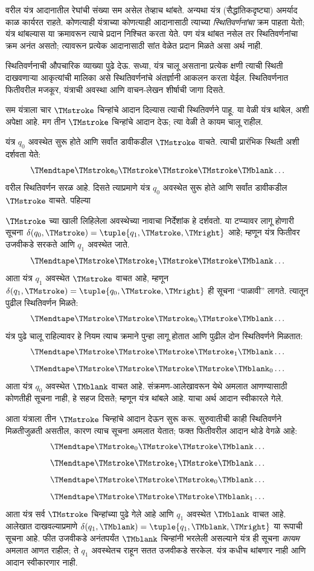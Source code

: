 \begin{explain}
वरील यंत्र आदानातील रेघांची संख्या सम असेल तेव्हाच थांबते.
अन्यथा यंत्र (सैद्धांतिकदृष्ट्या) अमर्याद काळ कार्यरत राहते.
कोणत्याही यंत्राच्या कोणत्याही आदानासाठी त्याच्या \emph{स्थितिवर्णनांचा}
क्रम पाहता येतो; यंत्र थांबल्यास या क्रमावरून त्याचे प्रदान निश्चित
करता येते. पण यंत्र थांबत नसेल तर स्थितिवर्णनांचा क्रम अनंत असतो;
त्यावरून प्रत्येक आदानासाठी सांत वेळेत प्रदान मिळते असा अर्थ नाही.

स्थितिवर्णनाची औपचारिक
व्याख्या पुढे देऊ. सध्या, यंत्र चालू असताना प्रत्येक क्षणी त्याची
स्थिती दाखवणाऱ्या आकृत्यांची मालिका असे स्थितिवर्णनांचे अंतर्ज्ञानी
आकलन करता येईल. स्थितिवर्णनात फितीवरील मजकूर, यंत्राची अवस्था
आणि वाचन-लेखन शीर्षाची जागा दिसते.

सम यंत्राला चार $\TMstroke$ चिन्हांचे आदान दिल्यास त्याची
स्थितिवर्णने पाहू. या वेळी यंत्र थांबेल, अशी अपेक्षा आहे. मग
तीन $\TMstroke$ चिन्हांचे आदान देऊ; त्या वेळी ते कायम चालू राहील.

यंत्र $q_0$ अवस्थेत सुरू होते आणि सर्वांत डावीकडील $\TMstroke$
वाचते. त्याची प्रारंभिक स्थिती अशी दर्शवता येते:
\[\TMendtape \TMstroke_0 \TMstroke \TMstroke \TMstroke \TMblank \ldots
\]
वरील स्थितिवर्णन सरळ आहे. दिसते त्याप्रमाणे यंत्र $q_0$ अवस्थेत
सुरू होते आणि सर्वांत डावीकडील $\TMstroke$ वाचते. पहिल्या

$\TMstroke$ च्या खाली लिहिलेला अवस्थेच्या नावाचा निर्देशांक हे
दर्शवतो. या टप्प्यावर लागू होणारी सूचना
$\delta(q_0, \TMstroke) = \tuple{q_1, \TMstroke, \TMright}$ आहे;
म्हणून यंत्र फितीवर उजवीकडे सरकते आणि $q_1$ अवस्थेत जाते.
\[\TMendtape \TMstroke \TMstroke_1 \TMstroke \TMstroke \TMblank \ldots
\]
आता यंत्र $q_1$ अवस्थेत $\TMstroke$ वाचत आहे, म्हणून
$\delta(q_1, \TMstroke) = \tuple{q_0,
  \TMstroke, \TMright}$ ही सूचना ``पाळावी'' लागते. त्यातून पुढील
स्थितिवर्णन मिळते:
\[\TMendtape \TMstroke \TMstroke \TMstroke_0 \TMstroke \TMblank \ldots
\]
यंत्र पुढे चालू राहिल्यावर हे नियम त्याच क्रमाने पुन्हा लागू होतात
आणि पुढील दोन स्थितिवर्णने मिळतात:
\[\TMendtape \TMstroke \TMstroke \TMstroke \TMstroke_1 \TMblank \ldots
\]
\[\TMendtape \TMstroke \TMstroke \TMstroke \TMstroke \TMblank_0 \ldots
\]
आता यंत्र $q_0$ अवस्थेत $\TMblank$ वाचत आहे. संक्रमण-आलेखावरून
येथे अमलात आणण्यासाठी कोणतीही सूचना नाही, हे सहज दिसते;
म्हणून यंत्र थांबले आहे. याचा अर्थ आदान स्वीकारले गेले.

आता यंत्राला तीन $\TMstroke$ चिन्हांचे आदान देऊन सुरू करू.
सुरुवातीची काही स्थितिवर्णने मिळतीजुळती असतील, कारण त्याच सूचना
अमलात येतात; फक्त फितीवरील आदान थोडे वेगळे आहे:
\[\TMendtape \TMstroke_0 \TMstroke \TMstroke \TMblank \ldots
\]
\[\TMendtape \TMstroke \TMstroke_1 \TMstroke \TMblank \ldots
\]
\[\TMendtape \TMstroke \TMstroke \TMstroke_0 \TMblank \ldots
\]
\[\TMendtape \TMstroke \TMstroke \TMstroke \TMblank_1 \ldots
\]
आता यंत्र सर्व $\TMstroke$ चिन्हांच्या पुढे गेले आहे आणि $q_1$
अवस्थेत $\TMblank$ वाचत आहे. आलेखात दाखवल्याप्रमाणे
$\delta(q_1, \TMblank) =\tuple{q_1,
\TMblank, \TMright}$ या रूपाची सूचना आहे. फीत उजवीकडे अनंतपर्यंत
$\TMblank$ चिन्हांनी भरलेली असल्याने यंत्र ही सूचना \emph{कायम}
अमलात आणत राहील; ते $q_1$ अवस्थेतच राहून सतत उजवीकडे सरकेल.
यंत्र कधीच थांबणार नाही आणि आदान स्वीकारणार नाही.
\end{explain}

